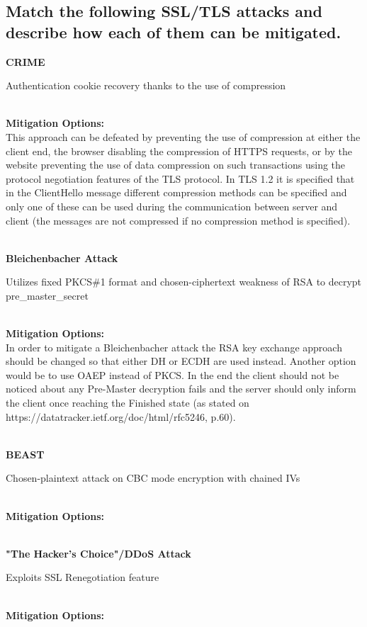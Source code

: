 \documentclass{report}
\begin{document}
		\subsection{Match the following SSL/TLS attacks and describe how each of them can be mitigated.}
		\startsubsection
			\parbox{6.5cm}{\textbf{CRIME}\dotfill} \parbox[t]{8cm}{Authentication cookie recovery thanks to the use of compression} \\
			\textbf{Mitigation Options:} \\
			This approach can be defeated by preventing the use of compression at either the client end, the browser disabling the compression of HTTPS requests, or by the website preventing the use of data compression on such transactions using the protocol negotiation features of the TLS protocol. In TLS 1.2 it is specified that in the ClientHello message different compression methods can be specified and only one of these can be used during the communication between server and client (the messages are not compressed if no compression method is specified).\\
			\\\parbox{6.5cm}{\textbf{Bleichenbacher Attack}\dotfill} \parbox[t]{8cm}{Utilizes fixed PKCS\#1 format and chosen-ciphertext weakness of RSA to decrypt pre\_master\_secret} \\
			\textbf{Mitigation Options:} \\
			In order to mitigate a Bleichenbacher attack the RSA key exchange approach should be changed so that either DH or ECDH are used instead. Another option would be to use OAEP instead of PKCS. In the end the client should not be noticed about any Pre-Master decryption fails and the server should only inform the client once reaching the Finished state (as stated on https://datatracker.ietf.org/doc/html/rfc5246, p.60). \\
			\\\parbox{6.5cm}{\textbf{BEAST}\dotfill} \parbox[t]{8cm}{Chosen-plaintext attack on CBC mode encryption with chained IVs} \\
			\textbf{Mitigation Options:} \\
			\\\parbox{6.5cm}{\textbf{"The Hacker's Choice"/DDoS Attack}\dotfill} \parbox[t]{8cm}{Exploits SSL Renegotiation feature} \\
			\textbf{Mitigation Options:} \\
		\closesection
	\closesection
\end{document}
